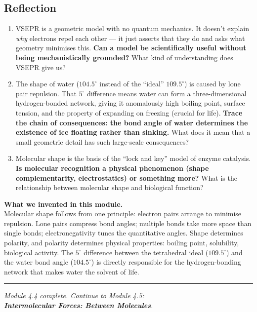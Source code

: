 \documentclass[12pt, a4paper]{book}
\begin{document}
\subsection*{Reflection}

\begin{reflectionbox}
\begin{enumerate}[label=\textbf{R\arabic*.}]
  \item VSEPR is a geometric model with no quantum mechanics.
    It doesn't explain \emph{why} electrons repel each other ---
    it just asserts that they do and asks what geometry minimises this.
    \textbf{Can a model be scientifically useful without
    being mechanistically grounded?}
    What kind of understanding does VSEPR give us?

  \item The shape of water ($104.5^\circ$ instead of the
    ``ideal'' $109.5^\circ$) is caused by lone pair repulsion.
    That $5^\circ$ difference means water can form a
    three-dimensional hydrogen-bonded network, giving it
    anomalously high boiling point, surface tension, and
    the property of expanding on freezing (crucial for life).
    \textbf{Trace the chain of consequences: the bond angle
    of water determines the existence of ice floating
    rather than sinking.}
    What does it mean that a small geometric detail
    has such large-scale consequences?

  \item Molecular shape is the basis of the ``lock and key''
    model of enzyme catalysis.
    \textbf{Is molecular recognition a physical phenomenon
    (shape complementarity, electrostatics)
    or something more?}
    What is the relationship between molecular shape and
    biological function?
\end{enumerate}
\end{reflectionbox}

\vspace{1.5em}
\begin{center}
\begin{tcolorbox}[enhanced, colback=DiscoveryColor!8, colframe=DiscoveryColor,
  width=0.88\textwidth, arc=3pt]
\centering\sffamily\small
\textbf{What we invented in this module.}\\[4pt]
Molecular shape follows from one principle: electron pairs
arrange to minimise repulsion.
Lone pairs compress bond angles; multiple bonds take more
space than single bonds; electronegativity tunes the
quantitative angles.
Shape determines polarity, and polarity determines physical
properties: boiling point, solubility, biological activity.
The $5^\circ$ difference between the tetrahedral ideal
($109.5^\circ$) and the water bond angle ($104.5^\circ$)
is directly responsible for the hydrogen-bonding network
that makes water the solvent of life.
\end{tcolorbox}
\end{center}

\vspace{2em}
\noindent\textcolor{JourneyColor!40}{\rule{\textwidth}{0.6pt}}
\begin{center}\textit{\sffamily\small
Module 4.4 complete. Continue to Module 4.5:\\
\textbf{Intermolecular Forces: Between Molecules}.}
\end{center}
\end{document}
